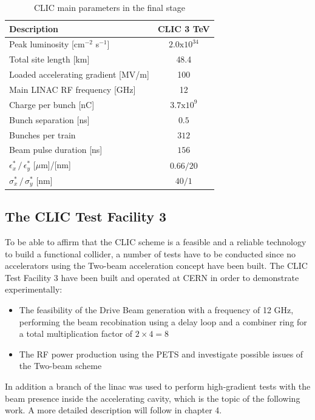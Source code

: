 \begin{table}[h]
  \centering
    \begin{tabular}{ l c  }
    \hline
    \hline
    \textbf{Description}						& \textbf{CLIC 3 TeV}	\\
    \hline
    Peak luminosity [cm$^{-2}$ s$^{-1}$]			& $2.0\text{x}10^{34}$	\\
    Total site length [km]						& 48.4				\\
    Loaded accelerating gradient [MV/m]			& 100	\\
    Main LINAC RF frequency	[GHz]			& 12	\\
    Charge per bunch [nC]						& $3.7\text{x}10^{9}$ \\
    Bunch separation [ns]						& $0.5$ \\
    Bunches per train							& $312$ \\
    Beam pulse duration [ns]					& $156$ \\
    $\epsilon^*_x \, / \, \epsilon^*_y$ [$\mu$m]/[nm]	& $0.66/20$ \\  
    $\sigma^*_x\, / \, \sigma^*_y$ [nm]			& $40/1$	\\
    
    \hline
    \hline
    \end{tabular}
  \caption{CLIC main parameters in the final stage}
\label{table_CLIC_params}
\end{table}







\subsection[CTF3]{The CLIC Test Facility 3}

To be able to affirm that the CLIC scheme is a feasible and a reliable technology to build a functional collider, a number of tests have to be conducted since no accelerators using the Two-beam acceleration concept have been built. The CLIC Test Facility 3 have been built and operated at CERN in order to demonstrate experimentally:

\begin{itemize}
\item The feasibility of the Drive Beam generation with a frequency of 12 GHz, performing the beam recobination using a delay loop and a combiner ring for a total multiplication factor of $2\times4 =8$
\item The RF power production using the PETS and investigate possible issues of the Two-beam scheme
\end{itemize}
In addition a branch of the linac was used to perform high-gradient tests with the beam presence inside the accelerating cavity, which is the topic of the following work. A more detailed description will follow in chapter 4.
